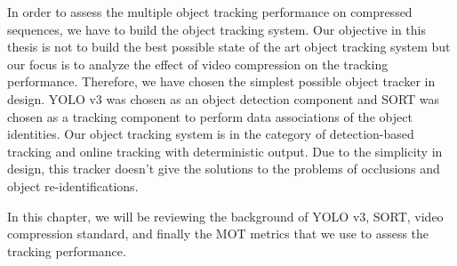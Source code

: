 
In order to assess the multiple object tracking performance on compressed sequences, we have to build the object tracking system. Our objective in this thesis is not to build the best possible state of the art object tracking system but our focus is to analyze the effect of video compression on the tracking performance. Therefore, we have chosen the simplest possible object tracker in design. YOLO v3 was chosen as an object detection component and SORT was chosen as a tracking component to perform data associations of the object identities. Our object tracking system is in the category of detection-based tracking and online tracking with deterministic output. Due to the simplicity in design, this tracker doesn't give the solutions to the problems of occlusions and object re-identifications. 

In this chapter, we will be reviewing the background of YOLO v3, SORT, video compression standard, and finally the MOT metrics that we use to assess the tracking performance.
